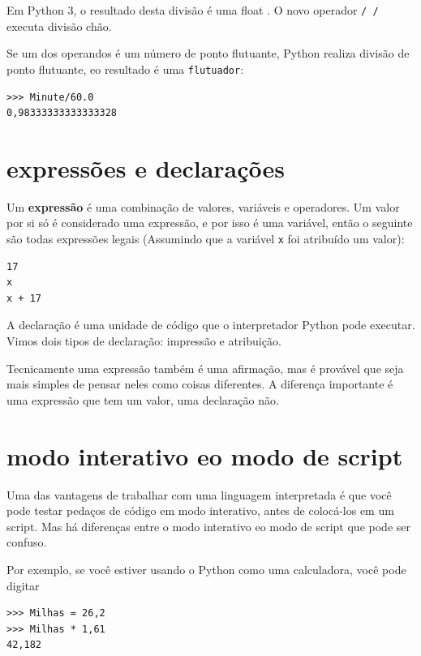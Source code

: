 \documentclass[10pt]{book}
\begin{document}
Em Python 3, o resultado desta divisão é uma {float \tt}. O novo operador
{\tt / /} executa divisão chão.

Se um dos operandos é um número de ponto flutuante, Python realiza
divisão de ponto flutuante, eo resultado é uma {\tt flutuador}:

\begin{verbatim}
>>> Minute/60.0
0,98333333333333328
\end{verbatim}


\section{expressões e declarações}

Um {\bf expressão} é uma combinação de valores, variáveis ​​e operadores.
Um valor por si só é considerado uma expressão, e por isso é
uma variável, então o seguinte são todas expressões legais
(Assumindo que a variável {\tt x} foi atribuído um valor):

\begin{verbatim}
17
x
x + 17
\end{verbatim}
%
A declaração {\bf} é uma unidade de código que o interpretador Python pode
executar. Vimos dois tipos de declaração: impressão e
atribuição.

Tecnicamente uma expressão também é uma afirmação, mas é provável que seja
mais simples de pensar neles como coisas diferentes. A diferença importante
é uma expressão que tem um valor, uma declaração não.


\section{modo interativo eo modo de script}

Uma das vantagens de trabalhar com uma linguagem interpretada é que
você pode testar pedaços de código em modo interativo, antes de colocá-los
em um script. Mas há diferenças entre o modo interativo
eo modo de script que pode ser confuso.

Por exemplo, se você estiver usando o Python como uma calculadora, você pode digitar

\begin{verbatim}
>>> Milhas = 26,2
>>> Milhas * 1,61
42,182
\end{verbatim}
\end{document}
